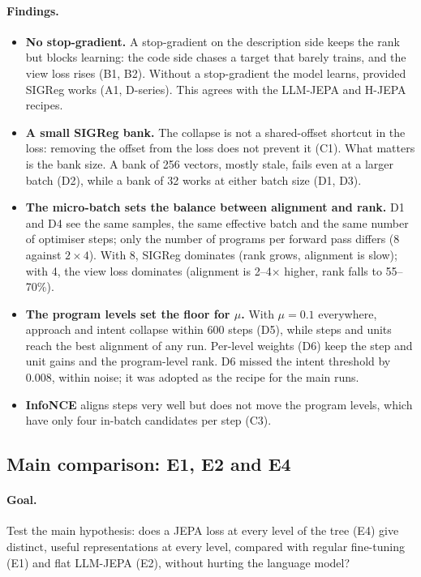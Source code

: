 \documentclass[11pt]{article}
\begin{document}
\paragraph{Findings.}
\begin{itemize}
  \item \textbf{No stop-gradient.} A stop-gradient on the description side keeps the rank but blocks learning: the
        code side chases a target that barely trains, and the view loss rises (B1, B2). Without a stop-gradient the
        model learns, provided SIGReg works (A1, D-series). This agrees with the LLM-JEPA and H-JEPA recipes.
  \item \textbf{A small SIGReg bank.} The collapse is not a shared-offset shortcut in the loss: removing the offset
        from the loss does not prevent it (C1). What matters is the bank size. A bank of 256 vectors, mostly stale,
        fails even at a larger batch (D2), while a bank of 32 works at either batch size (D1, D3).
  \item \textbf{The micro-batch sets the balance between alignment and rank.} D1 and D4 see the same samples, the
        same effective batch and the same number of optimiser steps; only the number of programs per forward pass
        differs (8 against $2\times4$). With 8, SIGReg dominates (rank grows, alignment is slow); with 4, the view loss
        dominates (alignment is 2--4$\times$ higher, rank falls to 55--70\%).
  \item \textbf{The program levels set the floor for $\mu$.} With $\mu=0.1$ everywhere, approach and intent collapse
        within 600 steps (D5), while steps and units reach the best alignment of any run. Per-level weights (D6) keep
        the step and unit gains and the program-level rank. D6 missed the intent threshold by 0.008, within noise;
        it was adopted as the recipe for the main runs.
  \item \textbf{InfoNCE} aligns steps very well but does not move the program levels, which have only four in-batch
        candidates per step (C3).
\end{itemize}

\subsection{Main comparison: E1, E2 and E4}
\label{sec:exp-main}

\paragraph{Goal.} Test the main hypothesis: does a JEPA loss at every level of the tree (E4) give distinct,
useful representations at every level, compared with regular fine-tuning (E1) and flat LLM-JEPA (E2), without
hurting the language model?
\end{document}
